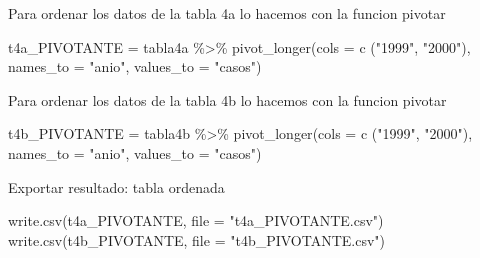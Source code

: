 \documentclass[
]{article}
\newenvironment{Shaded}{\begin{snugshade}}{\end{snugshade}}
\newcommand{\AttributeTok}[1]{\textcolor[rgb]{0.77,0.63,0.00}{#1}}
\newcommand{\FunctionTok}[1]{\textcolor[rgb]{0.00,0.00,0.00}{#1}}
\newcommand{\NormalTok}[1]{#1}
\newcommand{\OtherTok}[1]{\textcolor[rgb]{0.56,0.35,0.01}{#1}}
\newcommand{\SpecialCharTok}[1]{\textcolor[rgb]{0.00,0.00,0.00}{#1}}
\newcommand{\StringTok}[1]{\textcolor[rgb]{0.31,0.60,0.02}{#1}}
\begin{document}
Para ordenar los datos de la tabla 4a lo hacemos con la funcion pivotar

\begin{Shaded}
\begin{Highlighting}[]
\NormalTok{t4a\_PIVOTANTE }\OtherTok{=}\NormalTok{ tabla4a }\SpecialCharTok{\%\textgreater{}\%} 
  \FunctionTok{pivot\_longer}\NormalTok{(}\AttributeTok{cols =} \FunctionTok{c}\NormalTok{ (}\StringTok{"1999"}\NormalTok{, }\StringTok{"2000"}\NormalTok{), }\AttributeTok{names\_to =} \StringTok{"anio"}\NormalTok{, }\AttributeTok{values\_to =} \StringTok{"casos"}\NormalTok{)}
\end{Highlighting}
\end{Shaded}

Para ordenar los datos de la tabla 4b lo hacemos con la funcion pivotar

\begin{Shaded}
\begin{Highlighting}[]
\NormalTok{t4b\_PIVOTANTE }\OtherTok{=}\NormalTok{ tabla4b }\SpecialCharTok{\%\textgreater{}\%} 
  \FunctionTok{pivot\_longer}\NormalTok{(}\AttributeTok{cols =} \FunctionTok{c}\NormalTok{ (}\StringTok{"1999"}\NormalTok{, }\StringTok{"2000"}\NormalTok{), }\AttributeTok{names\_to =} \StringTok{"anio"}\NormalTok{, }\AttributeTok{values\_to =} \StringTok{"casos"}\NormalTok{)}
\end{Highlighting}
\end{Shaded}

Exportar resultado: tabla ordenada

\begin{Shaded}
\begin{Highlighting}[]
\FunctionTok{write.csv}\NormalTok{(t4a\_PIVOTANTE, }\AttributeTok{file =} \StringTok{"t4a\_PIVOTANTE.csv"}\NormalTok{)}
\FunctionTok{write.csv}\NormalTok{(t4b\_PIVOTANTE, }\AttributeTok{file =} \StringTok{"t4b\_PIVOTANTE.csv"}\NormalTok{)}
\end{Highlighting}
\end{Shaded}
\end{document}
